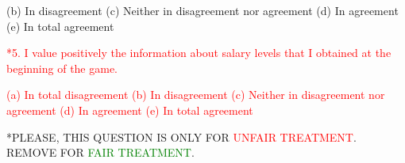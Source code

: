 \documentclass[a4paper, 12pt]{article}
\begin{document}
\begin{appendices}
(b) In disagreement \newline
(c) Neither in disagreement nor agreement \newline
(d) In agreement \newline
(e) In total agreement \newline
\begin{center}
\textcolor{Red}{*5. I value positively the information about salary levels that I obtained at the beginning of the game.}    
\end{center}
\textcolor{Red}{
(a) In total disagreement \newline
(b) In disagreement \newline
(c) Neither in disagreement nor agreement \newline
(d) In agreement \newline
(e) In total agreement} \newline
\end{appendices}

*PLEASE, THIS QUESTION IS ONLY FOR \textcolor{Red}{UNFAIR TREATMENT}. REMOVE FOR \textcolor{Green}{FAIR TREATMENT}.
\newpage


\end{document}
